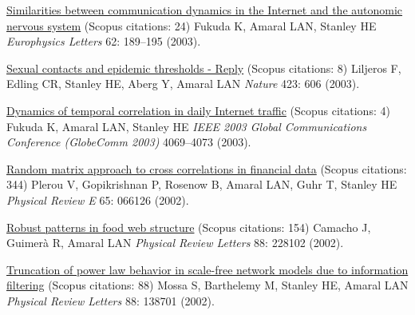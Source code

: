 \NumberedItem{\makebox[0.8cm][r]{[49]}}
\href{/people/amaral/similarities-between-communication-dynamics-in-the-internet-and-the-autonomic-nervous-system}
{Similarities between communication dynamics in the Internet and the autonomic nervous system}
    (Scopus citations: 24)
\newline
Fukuda K, Amaral LAN, Stanley HE
\newline
\textit{Europhysics Letters}
    62:
189--195 (2003).
\newline
\Gap
~
\Gap

\NumberedItem{\makebox[0.8cm][r]{[48]}}
\href{/people/amaral/sexual-contacts-and-epidemic-thresholds-reply}
{Sexual contacts and epidemic thresholds - Reply}
    (Scopus citations: 8)
\newline
Liljeros F, Edling CR, Stanley HE, Aberg Y, Amaral LAN
\newline
\textit{Nature}
    423:
606 (2003).
\newline
\Gap
~
\Gap

\NumberedItem{\makebox[0.8cm][r]{[47]}}
\href{/people/amaral/dynamics-of-temporal-correlation-in-daily-internet-traffic}
{Dynamics of temporal correlation in daily Internet traffic}
    (Scopus citations: 4)
\newline
Fukuda K, Amaral LAN, Stanley HE
\newline
\textit{IEEE 2003 Global Communications Conference (GlobeComm 2003)}
4069--4073 (2003).
\newline
\Gap
~
\Gap

\NumberedItem{\makebox[0.8cm][r]{[46]}}
\href{/people/amaral/random-matrix-approach-to-cross-correlations-in-financial-data}
{Random matrix approach to cross correlations in financial data}
    (Scopus citations: 344)
\newline
Plerou V, Gopikrishnan P, Rosenow B, Amaral LAN, Guhr T, Stanley HE
\newline
\textit{Physical Review E}
    65:
066126 (2002).
\newline
\Gap
~
\Gap

\NumberedItem{\makebox[0.8cm][r]{[45]}}
\href{/people/amaral/robust-patterns-in-food-web-structure}
{Robust patterns in food web structure}
    (Scopus citations: 154)
\newline
Camacho J, Guimer\`a R, Amaral LAN
\newline
\textit{Physical Review Letters}
    88:
228102 (2002).
\newline
\Gap
~
\Gap

\NumberedItem{\makebox[0.8cm][r]{[44]}}
\href{/people/amaral/truncation-of-power-law-behavior-in-scale-free-network-models-due-to-information-filtering}
{Truncation of power law behavior in scale-free network models due to information filtering}
    (Scopus citations: 88)
\newline
Mossa S, Barthelemy M, Stanley HE, Amaral LAN
\newline
\textit{Physical Review Letters}
    88:
138701 (2002).
\newline
\Gap
~
\Gap

